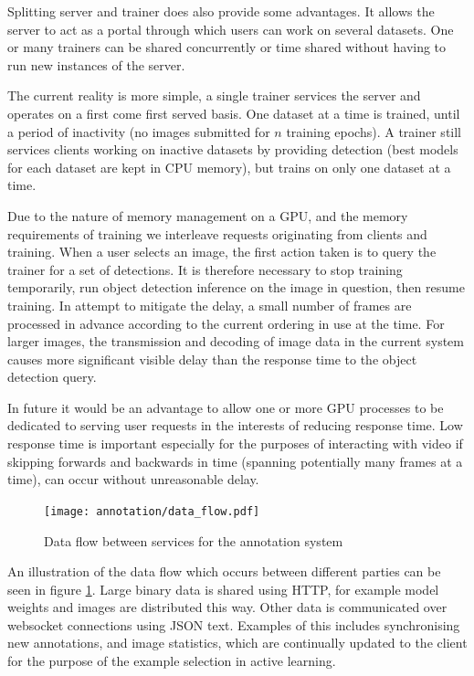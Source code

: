 Splitting server and trainer does also provide some advantages. It allows the server to act as a portal through which users can work on several datasets. One or many trainers can be shared concurrently or time shared without having to run new instances of the server. 

The current reality is more simple, a single trainer services the server and operates on a first come first served basis. One dataset at a time is trained, until a period of inactivity (no images submitted for $ n $ training epochs). A trainer still services clients working on inactive datasets by providing detection (best models for each dataset are kept in \gls{CPU} memory), but trains on only one dataset at a time. 

Due to the nature of memory management on a \gls{GPU}, and the memory requirements of training we interleave requests originating from clients and training. When a user selects an image, the first action taken is to query the trainer for a set of detections. It is therefore necessary to stop training temporarily, run object detection inference on the image in question, then resume training. In attempt to mitigate the delay, a small number of frames are processed in advance according to the current ordering in use at the time. For larger images, the transmission and decoding of image data in the current system causes more significant visible delay than the response time to the object detection query.

In future it would be an advantage to allow one or more \gls{GPU} processes to be dedicated to serving user requests in the interests of reducing response time. Low response time is important especially for the purposes of interacting with video if skipping forwards and backwards in time (spanning potentially many frames at a time), can occur without unreasonable delay.

\begin{figure}[h!]
  \centering
  \texttt{[image: annotation/data\_flow.pdf]}
  \caption{Data flow between services for the annotation system}  
  \label{fig:data_flow}
\end{figure}

An illustration of the data flow which occurs between different parties can be seen in figure \ref{fig:data_flow}. Large binary data is shared using \gls{HTTP}, for example model weights and images are distributed this way. Other data is communicated over websocket connections using \gls{JSON} text. Examples of this includes synchronising new annotations, and image statistics, which are continually updated to the client for the purpose of the example selection in active learning.

